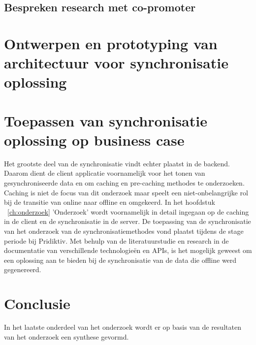 \subsection{Bespreken research met co-promoter}

\section{Ontwerpen en prototyping van architectuur voor synchronisatie oplossing}
\section{Toepassen van synchronisatie oplossing op business case}
Het grootste deel van de synchronisatie vindt echter plaatst in de backend. Daarom dient de client applicatie voornamelijk voor het tonen van gesynchroniseerde data en om caching en pre-caching methodes te onderzoeken. Caching is niet de focus van dit onderzoek maar speelt een niet-onbelangrijke rol bij de transitie van online naar offline en omgekeerd. In het hoofdstuk ~\ref{ch:onderzoek} 'Onderzoek' wordt voornamelijk in detail ingegaan op de caching in de client en de synchronisatie in de server. De toepassing van de synchronisatie van het onderzoek van de synchronisatiemethodes vond plaatst tijdens de stage periode bij Pridiktiv. Met behulp van de literatuurstudie en research in de documentatie van verschillende technologie\"en en APIs, is het mogelijk geweest om een oplossing aan te bieden bij de synchronisatie van de data die offline werd gegenereerd. 
\section{Conclusie}
In het laatste onderdeel van het onderzoek wordt er op basis van de resultaten van het onderzoek een synthese gevormd.

